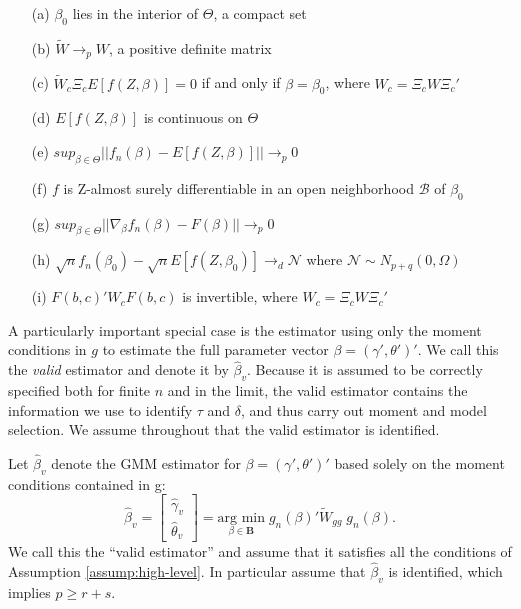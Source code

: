 \begin{assump}
  \label{assump:high-level}
    \mbox{}
\begin{itemize}
\item[(a)] $\beta_0$ lies in the interior of $\Theta$, a compact set
\item[(b)] $\widetilde{W} \rightarrow_{p} W$, a positive definite matrix
\item[(c)] $\widetilde{W}_c \Xi_c E[f(Z, \beta)] = 0$ if and only if $\beta = \beta_0$, where $W_c = \Xi_c W \Xi_c'$
\item[(d)] $E[f(Z,\beta)]$ is continuous on $\Theta$
\item[(e)] $sup_{\beta\in \Theta} ||f_n(\beta) - E[f(Z,\beta)]||\rightarrow_p 0$
\item[(f)] $f$ is Z-almost surely differentiable in an open neighborhood $\mathcal{B}$ of $\beta_0$
\item[(g)] $sup_{\beta \in \Theta} ||\nabla_{\beta} f_n(\beta) - F(\beta)|| \rightarrow_p 0 $
\item[(h)] $\sqrt{n}f_n(\beta_0) - \sqrt{n}E[f(Z,\beta_0)] \rightarrow_d \mathscr{N}$ where $\mathscr{N} \sim N_{p+q}(0,\Omega)$
\item[(i)] $F(b,c)' W_c F(b,c)$ is invertible, where $W_c = \Xi_c W \Xi_c'$
\end{itemize}
\end{assump}

  A particularly important special case is the estimator using only the moment conditions in $g$ to estimate the full parameter vector $\beta = \left(\gamma', \theta' \right)'$.
  We call this the \emph{valid} estimator and denote it by $\widehat{\beta}_v$.  
  Because it is assumed to be correctly specified both for finite $n$ and in the limit, the valid estimator contains the information we use to identify $\tau$ and $\delta$, and thus carry out moment and model selection. 
We assume throughout that the valid estimator is identified.

\begin{assump}
  Let $\widehat{\beta}_v$ denote the GMM estimator for $\beta = \left(\gamma', \theta' \right)'$ based solely on the moment conditions contained in g:
\begin{equation}
  \widehat{\beta}_v =\left[\begin{array}{c}\widehat{\gamma}_{v} \\  \widehat{\theta}_{v} \end{array} \right] =\underset{\beta \in \mathbf{B}}{\mbox{arg min}}\; g_n(\beta)' \widetilde{W}_{gg} \; g_n(\beta).
\end{equation}
We call this the ``valid estimator'' and assume that it satisfies all the conditions of Assumption \ref{assump:high-level}.
In particular assume that $\widehat{\beta}_v$ is identified, which implies $p \geq r+s$.
\end{assump}


